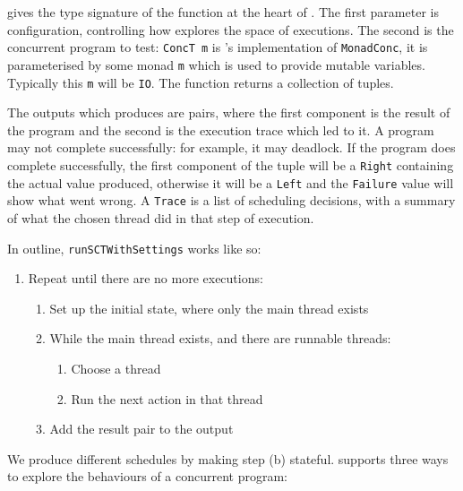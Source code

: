  gives the type signature of the function at the
heart of \dejafu{}.  The first parameter is configuration, controlling
how \dejafu{} explores the space of executions.  The second is the
concurrent program to test: \verb|ConcT m| is \dejafu{}'s
implementation of \verb|MonadConc|, it is parameterised by some monad
\verb|m| which is used to provide mutable variables.  Typically this
\verb|m| will be \verb|IO|.  The function returns a collection of
tuples.

The outputs which \dejafu{} produces are pairs, where the first
component is the result of the program and the second is the execution
trace which led to it.  A program may not complete successfully: for
example, it may deadlock.  If the program does complete successfully,
the first component of the tuple will be a \verb|Right| containing the
actual value produced, otherwise it will be a \verb|Left| and the
\verb|Failure| value will show what went wrong.  A \verb|Trace| is a
list of scheduling decisions, with a summary of what the chosen thread
did in that step of execution.

In outline, \verb|runSCTWithSettings| works like so:

\begin{enumerate}
\item Repeat until there are no more executions:
  \begin{enumerate}
  \item Set up the initial state, where only the main thread exists
  \item While the main thread exists, and there are runnable threads:
    \begin{enumerate}
    \item Choose a thread
    \item Run the next action in that thread
    \end{enumerate}
  \item Add the result pair to the output
  \end{enumerate}
\end{enumerate}

We produce different schedules by making step (b) stateful.  \dejafu{}
supports three ways to explore the behaviours of a concurrent program:

